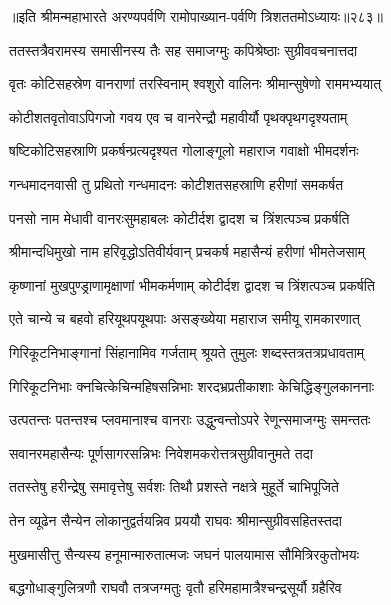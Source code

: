 ॥इति श्रीमन्महाभारते अरण्यपर्वणि रामोपाख्यान-पर्वणि त्रिशततमोऽध्यायः॥२८३॥

\storymeta

\resetShloka



\twolineshloka
{ततस्तत्रैवरामस्य समासीनस्य तैः सह}
{समाजग्मुः कपिश्रेष्ठाः सुग्रीववचनात्तदा}


\twolineshloka
{वृतः कोटिसहस्रेण वानराणां तरस्विनाम्}
{श्वशुरो वालिनः श्रीमान्सुषेणो राममभ्ययात्}


\twolineshloka
{कोटीशतवृतोवाऽपिगजो गवय एव च}
{वानरेन्द्रौ महावीर्यौ पृथक्पृथगदृश्यताम्}


\twolineshloka
{षष्टिकोटिसहस्राणि प्रकर्षन्प्रत्यदृश्यत}
{गोलाङ्गूलो महाराज गवाक्षो भीमदर्शनः}


\twolineshloka
{गन्धमादनवासी तु प्रथितो गन्धमादनः}
{कोटीशतसहस्राणि हरीणां समकर्षत}


\twolineshloka
{पनसो नाम मेधावी वानरःसुमहाबलः}
{कोटीर्दश द्वादश च त्रिंशत्पञ्च प्रकर्षति}


\twolineshloka
{श्रीमान्दधिमुखो नाम हरिवृद्धोऽतिवीर्यवान्}
{प्रचकर्ष महासैन्यं हरीणां भीमतेजसाम्}


\twolineshloka
{कृष्णानां मुखपुण्ड्राणामृक्षाणां भीमकर्मणाम्}
{कोटीर्दश द्वादश च त्रिंशत्पञ्च प्रकर्षति}


\twolineshloka
{एते चान्ये च बहवो हरियूथपयूथपाः}
{असङ्ख्येया महाराज समीयू रामकारणात्}


\twolineshloka
{गिरिकूटनिभाङ्गानां सिंहानामिव गर्जताम्}
{श्रूयते तुमुलः शब्दस्तत्रतत्रप्रधावताम्}


\twolineshloka
{गिरिकूटनिभाः क्नचित्केचिन्महिषसन्निभाः}
{शरदभ्रप्रतीकाशाः केचिद्धिङ्गुलकाननाः}


\twolineshloka
{उत्पतन्तः पतन्तश्च प्लवमानाश्च वानराः}
{उद्धुन्वन्तोऽपरे रेणून्समाजग्मुः समन्ततः}


\twolineshloka
{सवानरमहासैन्यः पूर्णसागरसन्निभः}
{निवेशमकरोत्तत्रसुग्रीवानुमते तदा}


\twolineshloka
{ततस्तेषु हरीन्द्रेषु समावृत्तेषु सर्वशः}
{तिथौ प्रशस्ते नक्षत्रे मुहूर्ते चाभिपूजिते}


\twolineshloka
{तेन व्यूढेन सैन्येन लोकानुद्वर्तयन्निव}
{प्रययौ राघवः श्रीमान्सुग्रीवसहितस्तदा}


\twolineshloka
{मुखमासीत्तु सैन्यस्य हनूमान्मारुतात्मजः}
{जघनं पालयामास सौमित्रिरकुतोभयः}


\twolineshloka
{बद्धगोधाङ्गुलित्रणौ राघवौ तत्रजग्मतुः}
{वृतौ हरिमहामात्रैश्चन्द्रसूर्यौ ग्रहैरिव}


